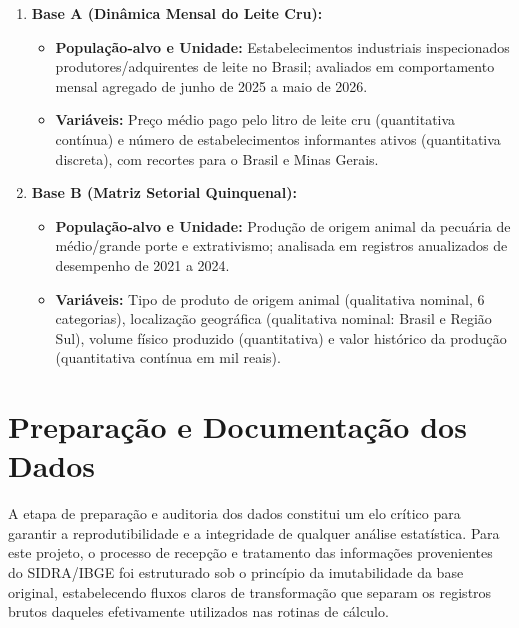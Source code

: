 \documentclass[12pt,a4paper]{article}
\begin{document}
\begin{enumerate}
    \item \textbf{Base A (Dinâmica Mensal do Leite Cru):}
    \begin{itemize}
        \item \textbf{População-alvo e Unidade:} Estabelecimentos industriais inspecionados produtores/adquirentes de leite no Brasil; avaliados em comportamento mensal agregado de junho de 2025 a maio de 2026.
        \item \textbf{Variáveis:} Preço médio pago pelo litro de leite cru (quantitativa contínua) e número de estabelecimentos informantes ativos (quantitativa discreta), com recortes para o Brasil e Minas Gerais.
    \end{itemize}
    
    \item \textbf{Base B (Matriz Setorial Quinquenal):}
    \begin{itemize}
        \item \textbf{População-alvo e Unidade:} Produção de origem animal da pecuária de médio/grande porte e extrativismo; analisada em registros anualizados de desempenho de 2021 a 2024.
        \item \textbf{Variáveis:} Tipo de produto de origem animal (qualitativa nominal, 6 categorias), localização geográfica (qualitativa nominal: Brasil e Região Sul), volume físico produzido (quantitativa) e valor histórico da produção (quantitativa contínua em mil reais).
    \end{itemize}
\end{enumerate}
\section{Preparação e Documentação dos Dados}
\label{sec:dados}

A etapa de preparação e auditoria dos dados constitui um elo crítico para garantir a reprodutibilidade e a integridade de qualquer análise estatística. Para este projeto, o processo de recepção e tratamento das informações provenientes do SIDRA/IBGE foi estruturado sob o princípio da imutabilidade da base original, estabelecendo fluxos claros de transformação que separam os registros brutos daqueles efetivamente utilizados nas rotinas de cálculo.
\end{document}
